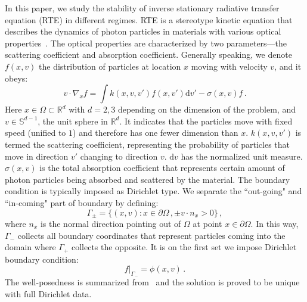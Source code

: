 \documentclass[english,reqno]{amsart}
\theoremstyle{plain}
\theoremstyle{definition} %
\newcommand{\rd}{\mathrm{d}}
\newcommand{\RR}{\mathbb{R}}
\newcommand{\Sp}{\mathbb{S}}
\begin{document}
In this paper, we study the stability of inverse stationary radiative transfer equation (RTE) in different regimes. RTE is a stereotype kinetic equation that describes the dynamics of photon particles in materials with various optical properties~\cite{CaseZweifel}. The optical properties are characterized by two parameters---the scattering coefficient and absorption coefficient. Generally speaking, we denote $f(x,v)$ the distribution of particles at location $x$ moving with velocity $v$, and it obeys:
\begin{equation*}
v\cdot\nabla_xf = \int k(x,v,v')f(x,v')\rd{v'} - \sigma(x,v) f\,.
\end{equation*}
Here $x\in\Omega\subset\RR^d$ with $d=2,3$ depending on the dimension of the problem, and $v\in\Sp^{d-1}$, the unit sphere in $\RR^d$. It indicates that the particles move with fixed speed (unified to $1$) and therefore has one fewer dimension than $x$. $k(x,v,v')$ is termed the scattering coefficient, representing the probability of particles that move in direction $v'$ changing to direction $v$. $\rd{v}$ has the normalized unit measure. $\sigma(x,v)$ is the total absorption coefficient that represents certain amount of photon particles being absorbed and scattered by the material. The boundary condition is typically imposed as Dirichlet type. We separate the ``out-going" and ``in-coming" part of boundary by defining:
\begin{equation}\label{eqn:boundary}
\Gamma_\pm = \{(x,v): x\in\partial\Omega\,, \pm v\cdot n_x >0\}\,,
\end{equation}
where $n_x$ is the normal direction pointing out of $\Omega$ at point $x\in\partial\Omega$. In this way, $\Gamma_-$ collects all boundary coordinates that represent particles coming into the domain where $\Gamma_+$ collects the opposite. It is on the first set we impose Dirichlet boundary condition:
\begin{equation} \label{eqn:BC}
f|_{\Gamma_-} = \phi(x,v)\,.
\end{equation}
The well-posedness is summarized from~\cite{Lions93} and the solution is proved to be unique with full Dirichlet data.
\end{document}
